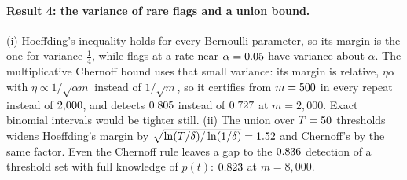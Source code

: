 \paragraph{Result 4: the variance of rare flags and a union bound.} (i) Hoeffding's inequality
holds for every Bernoulli parameter, so its margin is the one for variance $\frac14$, while flags at
a rate near $\alpha=0.05$ have variance about $\alpha$. The multiplicative Chernoff bound uses
that small variance: its margin is relative, $\eta\alpha$ with $\eta\propto1/\sqrt{\alpha m}$ instead of
$1/\sqrt m$, so it certifies from $m=500$ in every repeat instead of
$2{,}000$, and detects $0.805$ instead of $0.727$ at $m=2{,}000$.
Exact binomial intervals would be tighter still. (ii) The union over $T=50$ thresholds
widens Hoeffding's margin by $\sqrt{\ln(T/\delta)/\ln(1/\delta)}=1.52$ and Chernoff's by
the same factor. Even the Chernoff rule leaves a gap to the $0.836$ detection of a
threshold set with full knowledge of $p(t)$: $0.823$ at $m=8{,}000$.

